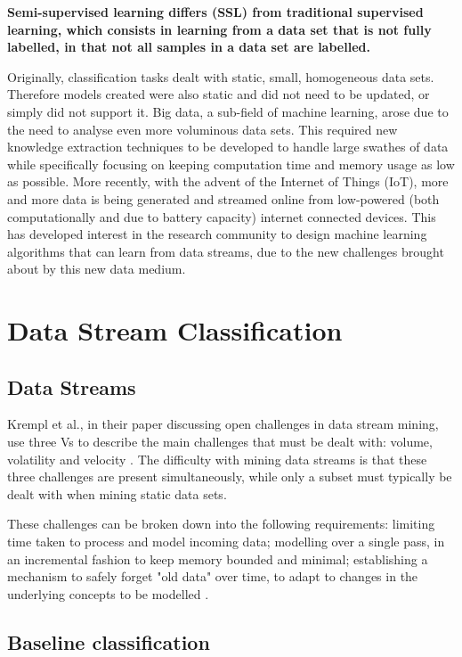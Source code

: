 \textbf{Semi-supervised learning differs (SSL) from traditional supervised learning, which consists in learning from a data set that is not fully labelled, in that not all samples in a data set are labelled.}

Originally, classification tasks dealt with static, small, homogeneous data sets. Therefore models created were also static and did not need to be updated, or simply did not support it. 
Big data, a sub-field of machine learning, arose due to the need to analyse even more voluminous data sets. This required new knowledge extraction techniques to be developed to handle large swathes of data while specifically focusing on keeping computation time and memory usage as low as possible.
More recently, with the advent of the Internet of Things (IoT), more and more data is being generated and streamed online from low-powered (both computationally and due to battery capacity) internet connected devices. This has developed interest in the research community to design machine learning algorithms that can learn from data streams, due to the new challenges brought about by this new data medium.

\section{Data Stream Classification}
\subsection{Data Streams}
Krempl et al., in their paper discussing open challenges in data stream mining, use three Vs to describe the main challenges that must be dealt with: volume, volatility and velocity \cite{krempl2014open}. The difficulty with mining data streams is that these three challenges are present simultaneously, while only a subset must typically be dealt with when mining static data sets.

These challenges can be broken down into the following requirements: limiting time taken to process and model incoming data; modelling over a single pass, in an incremental fashion to keep memory bounded and minimal; establishing a mechanism to safely forget "old data" over time, to adapt to changes in the underlying concepts to be modelled \cite{gama2010knowledge, gama2014survey, ghesmoune2016state, KRAWCZYK2017132, krempl2014open, silva2013data, widmer1996learning}.

\subsection{Baseline classification}
